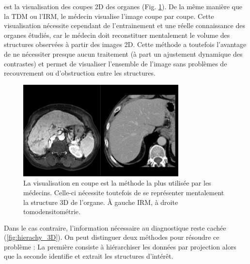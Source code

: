      est la visualisation des coupes 2D des organes (Fig. \ref{fig:slice_visualization}). De la même manière que la TDM ou l'IRM, le médecin visualise l'image coupe par coupe. Cette visualisation nécessite cependant de l'entrainement et une réelle connaissance des organes étudiés, car le médecin doit reconstituer mentalement le volume des structures observées à partir des images 2D. Cette méthode a toutefois l'avantage de ne nécessiter presque aucun traitement (à part un ajustement dynamique des contrastes) et permet de visualiser l'ensemble de l'image sans problèmes de recouvrement ou d'obstruction entre les structures. 

    \begin{figure}[!ht]
      \centering
      \includegraphics[height=5cm]{Images/2D_view.png}
      \caption{La visualisation en coupe est la méthode la plus utilisée par les médecins. Celle-ci nécessite toutefois de se représenter mentalement la structure 3D de l'organe. À gauche IRM, à droite tomodensitométrie.}
      \label{fig:slice_visualization}
    \end{figure}

     Dans le cas contraire, l'information nécessaire au diagnostique reste cachée (\ref{fig:hierachy_3D}). On peut distinguer deux méthodes pour résoudre ce problème : La première consiste à hiérarchiser les données par projection alors que la seconde identifie et extrait les structures d'intérêt.
    
